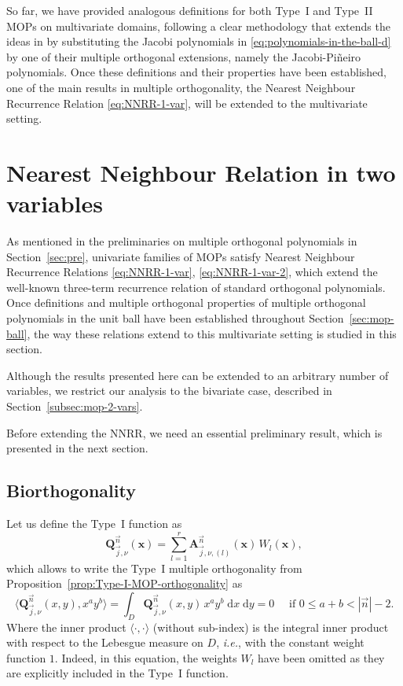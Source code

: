 \documentclass[a4paper]{article}
\theoremstyle{plain}
\theoremstyle{definition}
\newcommand{\dxdy}{\;\mathrm{d} x\;\mathrm{d} y}
\begin{document}
    So far, we have provided analogous definitions for both Type~I and Type~II MOPs on multivariate domains, following a clear methodology that extends the ideas in \cite{DX14} by substituting the Jacobi polynomials in \eqref{eq:polynomials-in-the-ball-d} by one of their multiple orthogonal extensions, namely the Jacobi-Pi\~neiro polynomials. Once these definitions and their properties have been established, one of the main results in multiple orthogonality, the Nearest Neighbour Recurrence Relation \eqref{eq:NNRR-1-var}, will be extended to the multivariate setting.
    
    \section{Nearest Neighbour Relation in two variables}\label{sec:NNR}

    As mentioned in the preliminaries on multiple orthogonal polynomials in Section~\ref{sec:pre}, univariate families of MOPs satisfy Nearest Neighbour Recurrence Relations \eqref{eq:NNRR-1-var}, \eqref{eq:NNRR-1-var-2}, which extend the well-known three-term recurrence relation of standard orthogonal polynomials. Once definitions and multiple orthogonal properties of multiple orthogonal polynomials in the unit ball have been established throughout  Section~\ref{sec:mop-ball}, the way these relations extend to this multivariate setting is studied in this section.

    Although the results presented here can be extended to an arbitrary number of variables, we restrict our analysis to the bivariate case, described in Section~\ref{subsec:mop-2-vars}.

    Before extending the NNRR, we need an essential preliminary result, which is presented in the next section. 

       

    \subsection{Biorthogonality}

    Let us define the Type~I function as
    \begin{equation}
        \label{eq:type-I-function}
        \mathbf Q_{\vec j,\nu}^{\vec n}(\mathbf x)=\sum_{l=1}^r \mathbf A_{\vec j,\nu,(l)}^{\vec n}(\mathbf x)\, W_l(\mathbf x),
    \end{equation}
    which allows to write the Type~I multiple orthogonality from Proposition~\ref{prop:Type-I-MOP-orthogonality} as
    $$
    \langle\mathbf Q_{\vec j,\nu}^{\vec n}(x,y),x^a y^b\rangle = \int_D \mathbf Q_{\vec j,\nu}^{\vec n}(x,y) \, x^a y^b \dxdy =0 \quad \text{ if }  0\leq a+b< |\vec n|-2.
    $$
    Where the inner product $\langle\cdot,\cdot\rangle$ (without sub-index) is the integral inner product with respect to the Lebesgue measure on $D$, \textit{i.e.}, with the constant weight function $1$. Indeed, in this equation, the weights $W_l$ have been omitted as they are explicitly included in the Type~I function. 
    
\end{document}
